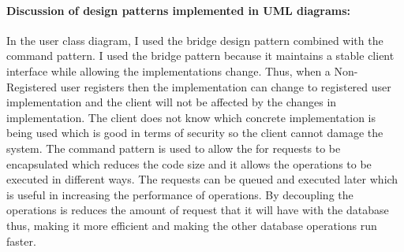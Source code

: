 \paragraph{Discussion of design patterns implemented in UML diagrams:}
		In the user class diagram, I used the bridge design pattern combined with the command pattern. I used the bridge pattern because it maintains a stable client interface while allowing the implementations change. Thus, when a Non-Registered user registers then the implementation can change to registered user implementation and the client will not be affected by the changes in implementation. The client does not know which concrete implementation is being used which is good in terms of security so the client cannot damage the system. The command pattern is used to allow the for requests to be encapsulated which reduces the code size and it allows the operations to be executed in different ways. The requests can be queued and executed later which is useful in increasing the performance of operations. By decoupling the operations is reduces the amount of request that it will have with the database thus, making it more efficient and making the other database operations run faster.
		
